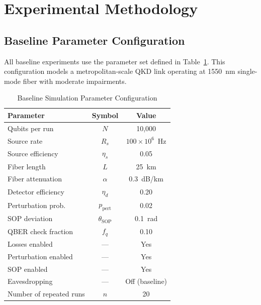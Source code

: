 \documentclass[journal]{IEEEtran}
\begin{document}
\section{Experimental Methodology}
\label{sec:methodology}

\subsection{Baseline Parameter Configuration}

All baseline experiments use the parameter set defined in
Table~\ref{tab:params}. This configuration models a metropolitan-scale
QKD link operating at 1550~nm single-mode fiber with moderate
impairments.

\begin{table}[!t]
  \caption{Baseline Simulation Parameter Configuration}
  \label{tab:params}
  \centering
  \footnotesize
  \begin{tabular}{lcc}
    \toprule
    Parameter & Symbol & Value \\
    \midrule
    Qubits per run         & $N$               & 10,000 \\
    Source rate            & $R_s$             & $100 \times 10^6$~Hz \\
    Source efficiency      & $\eta_s$          & 0.05 \\
    Fiber length           & $L$               & 25~km \\
    Fiber attenuation      & $\alpha$          & 0.3~dB/km \\
    Detector efficiency    & $\eta_d$          & 0.20 \\
    Perturbation prob.     & $p_{\mathrm{pert}}$& 0.02 \\
    SOP deviation          & $\theta_{\mathrm{SOP}}$ & 0.1~rad \\
    QBER check fraction    & $f_q$             & 0.10 \\
    Losses enabled         & ---               & Yes \\
    Perturbation enabled   & ---               & Yes \\
    SOP enabled            & ---               & Yes \\
    Eavesdropping          & ---               & Off (baseline) \\
    \midrule
    Number of repeated runs & $n$              & 20 \\
    \bottomrule
  \end{tabular}
\end{table}
\end{document}
